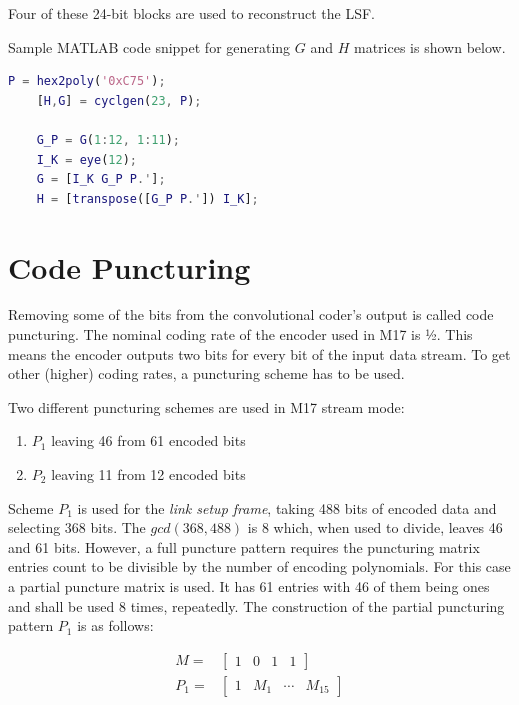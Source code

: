\documentclass[a4paper,11pt,oneside]{book}
\begin{document}
Four of these 24-bit blocks are used to reconstruct the LSF.

Sample MATLAB code snippet for generating $G$ and $H$ matrices is shown below.

\begin{lstlisting}[language=Matlab]
	P = hex2poly('0xC75');
	[H,G] = cyclgen(23, P);

	G_P = G(1:12, 1:11);
	I_K = eye(12);
	G = [I_K G_P P.'];
	H = [transpose([G_P P.']) I_K];
\end{lstlisting}

\chapter{Code Puncturing} \label{puncturing}

Removing some of the bits from the convolutional coder's output is
called code puncturing. The nominal coding rate of the encoder used in
M17 is ½. This means the encoder outputs two bits for every bit of the
input data stream. To get other (higher) coding rates, a puncturing
scheme has to be used.

Two different puncturing schemes are used in M17 stream mode:

\begin{enumerate}
	\def\labelenumi{\arabic{enumi}.}
	\item
	$P_1$ leaving 46 from 61 encoded bits
	\item
	$P_2$ leaving 11 from 12 encoded bits
\end{enumerate}

Scheme $P_1$ is used for the \emph{link setup frame}, taking 488 bits of encoded data and selecting 368 bits. The $gcd(368, 488)$ is 8 which, when used to divide, leaves 46 and 61 bits. However, a full puncture pattern requires the puncturing matrix entries count to be divisible by the number of encoding polynomials. For this case a partial puncture matrix is used. It has 61 entries with 46 of them being ones and shall be used 8 times, repeatedly. The construction of the partial puncturing pattern $P_1$ is as follows:

\begin{align}
	M = & \begin{bmatrix}
		1 & 0 & 1 & 1
	\end{bmatrix} \\
	P_{1} = & \begin{bmatrix}
		1 & M_{1} & \cdots & M_{15}
	\end{bmatrix}
\end{align}
\end{document}
